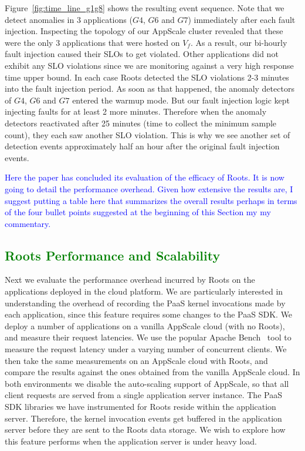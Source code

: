 Figure~\ref{fig:time_line_g1g8} shows the resulting event sequence. Note that we detect anomalies 
in 3 applications ($G4$, $G6$ and $G7$) immediately after each fault injection. Inspecting the 
topology of our AppScale cluster revealed that these were the only 3 applications that were 
hosted on $V_f$. As a result, our bi-hourly fault injection caused their SLOs to
get violated. Other applications did not exhibit any SLO violations since we are monitoring against
a very high response time upper bound. In each case Roots detected the SLO violations 2-3 minutes into the fault injection
period. As soon as that happened, the anomaly detectors of $G4$, $G6$ and $G7$ entered the warmup mode.
But our fault injection logic kept injecting faults for at least 2 more minutes. Therefore when the anomaly detectors
reactivated after 25 minutes (time to collect the minimum sample count), they each saw another SLO
violation. This is why we see another set of detection events approximately half an hour after the
original fault injection events.

\textcolor{blue}{Here the paper has concluded its evaluation of the
efficacy of Roots.  It is now going to detail the performance overhead.  Given
how extensive the results are, I suggest putting a table here that summarizes
the overall results perhaps in terms of the four bullet points suggested at
the beginning of this Section my my commentary.}

\textcolor{green}{
\subsection{Roots Performance and Scalability}
}

Next we evaluate the performance overhead incurred by Roots on the applications deployed in the 
cloud platform. We are particularly interested in understanding the overhead of recording the PaaS kernel
invocations made by each application, since this feature requires some changes to the PaaS SDK. 
We deploy a number of applications on a vanilla
AppScale cloud (with no Roots), and measure their request latencies. We use
the popular Apache Bench~\cite{XXX} tool to measure the request latency under a
varying number of concurrent clients. We then take the same measurements
on an AppScale cloud with Roots, and compare the results against the ones obtained
from the vanilla AppScale cloud. In both environments we disable the auto-scaling
support of AppScale, so that all client requests are served from a single application
server instance. The PaaS SDK libraries we have instrumented for Roots reside within
the application server. Therefore, the kernel invocation events get buffered in
the application server before they are sent to the Roots data storage. We wish to
explore how this feature performs when the application server is under heavy load.

